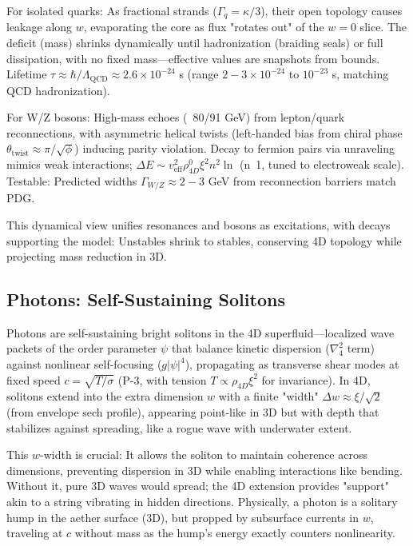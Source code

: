 For isolated quarks: As fractional strands ($\Gamma_q = \kappa / 3$), their open topology causes leakage along $w$, evaporating the core as flux "rotates out" of the $w=0$ slice. The deficit (mass) shrinks dynamically until hadronization (braiding seals) or full dissipation, with no fixed mass—effective values are snapshots from bounds. Lifetime $\tau \approx \hbar / \Lambda_{\text{QCD}} \approx 2.6 \times 10^{-24}$ s (range $2-3 \times 10^{-24}$ to $10^{-23}$ s, matching QCD hadronization).

For W/Z bosons: High-mass echoes (~80/91 GeV) from lepton/quark reconnections, with asymmetric helical twists (left-handed bias from chiral phase $\theta_{\text{twist}} \approx \pi / \sqrt{\phi}$) inducing parity violation. Decay to fermion pairs via unraveling mimics weak interactions; $\Delta E \sim v_{\text{eff}}^2 \rho_{4D}^0 \xi^2 n^2 \ln$ (n~1, tuned to electroweak scale). Testable: Predicted widths $\Gamma_{W/Z} \approx 2-3$ GeV from reconnection barriers match PDG.

This dynamical view unifies resonances and bosons as excitations, with decays supporting the model: Unstables shrink to stables, conserving 4D topology while projecting mass reduction in 3D.

\subsection{Photons: Self-Sustaining Solitons}

Photons are self-sustaining bright solitons in the 4D superfluid—localized wave packets of the order parameter $\psi$ that balance kinetic dispersion ($\nabla_4^2$ term) against nonlinear self-focusing ($g |\psi|^4$), propagating as transverse shear modes at fixed speed $c = \sqrt{T / \sigma}$ (P-3, with tension $T \propto \rho_{4D} \xi^2$ for invariance). In 4D, solitons extend into the extra dimension $w$ with a finite "width" $\Delta w \approx \xi / \sqrt{2}$ (from envelope sech profile), appearing point-like in 3D but with depth that stabilizes against spreading, like a rogue wave with underwater extent.

This $w$-width is crucial: It allows the soliton to maintain coherence across dimensions, preventing dispersion in 3D while enabling interactions like bending. Without it, pure 3D waves would spread; the 4D extension provides "support" akin to a string vibrating in hidden directions. Physically, a photon is a solitary hump in the aether surface (3D), but propped by subsurface currents in $w$, traveling at $c$ without mass as the hump's energy exactly counters nonlinearity.


